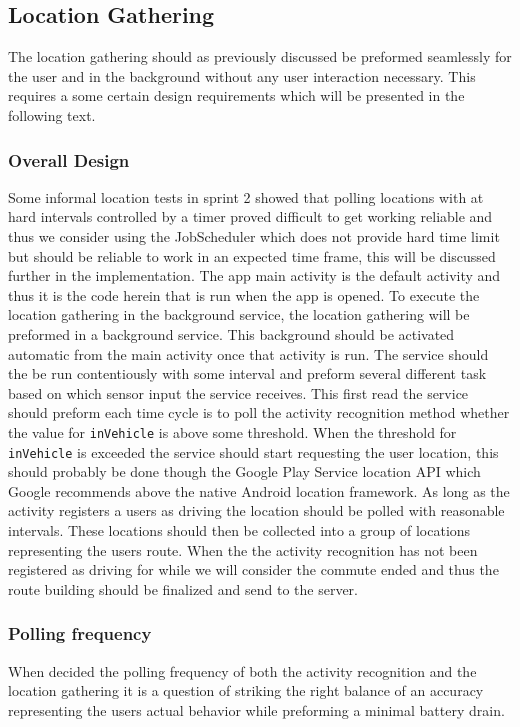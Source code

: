 \subsection{Location Gathering}
The location gathering should as previously discussed be preformed seamlessly for the user and in the background without any user interaction necessary. 
This requires a some certain design requirements which will be presented in the following text. 

\subsubsection{Overall Design}
Some informal location tests in sprint 2 showed that polling locations with at hard intervals controlled by a timer proved difficult to get working reliable and thus we consider using the JobScheduler which does not provide hard time limit but should be reliable to work in an expected time frame, this will be discussed further in the implementation.
The app main activity is the default activity and thus it is the code herein that is run when the app is opened.
To execute the location gathering in the background service, the location gathering will be preformed in a background service. 
This background should be activated automatic from the main activity once that activity is run.
The service should the be run contentiously with some interval and preform several different task based on which sensor input the service receives. 
This first read the service should preform each time cycle is to poll the activity recognition method whether the value for \texttt{inVehicle} is above some threshold. 
When the threshold for \texttt{inVehicle} is exceeded the service should start requesting the user location, this should probably be done though the Google Play Service location API which Google recommends above the native Android location framework\cite{apploc}.
As long as the activity registers a users as driving the location should be polled with reasonable intervals.
These locations should then be collected into a group of locations representing the users route.
When the the activity recognition has not been registered as driving for  while we will consider the commute ended and thus the route building should be finalized and send to the server.  

\subsubsection{Polling frequency}
When decided the polling frequency of both the activity recognition and the location gathering it is a question of striking the right balance of an accuracy representing the users actual behavior while preforming a minimal battery drain.


